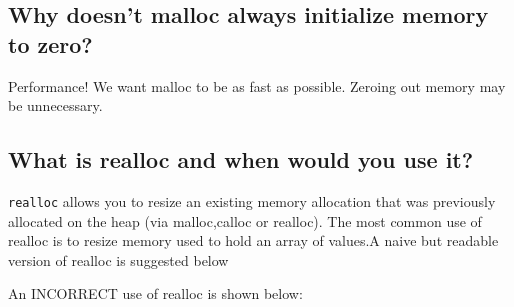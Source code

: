 \subsection{Why doesn't malloc always initialize memory to
zero?}\label{why-doesnt-malloc-always-initialize-memory-to-zero}

Performance! We want malloc to be as fast as possible. Zeroing out
memory may be unnecessary.

\subsection{What is realloc and when would you use
it?}\label{what-is-realloc-and-when-would-you-use-it}

\texttt{realloc} allows you to resize an existing memory allocation that
was previously allocated on the heap (via malloc,calloc or realloc). The
most common use of realloc is to resize memory used to hold an array of
values.A naive but readable version of realloc is suggested below

\begin{Shaded}
\begin{Highlighting}[]
  
   
   
   
\NormalTok{\}}
\end{Highlighting}
\end{Shaded}

An INCORRECT use of realloc is shown below:

\begin{Shaded}
\begin{Highlighting}[]
 \NormalTok{(}\NormalTok{) * }\NormalTok{);}
\NormalTok{array[}\NormalTok{] = }\NormalTok{; array[}\NormalTok{]; = }\NormalTok{;}
\NormalTok{); }
\NormalTok{array[}\NormalTok{] = }\NormalTok{; }
\end{Highlighting}
\end{Shaded}

